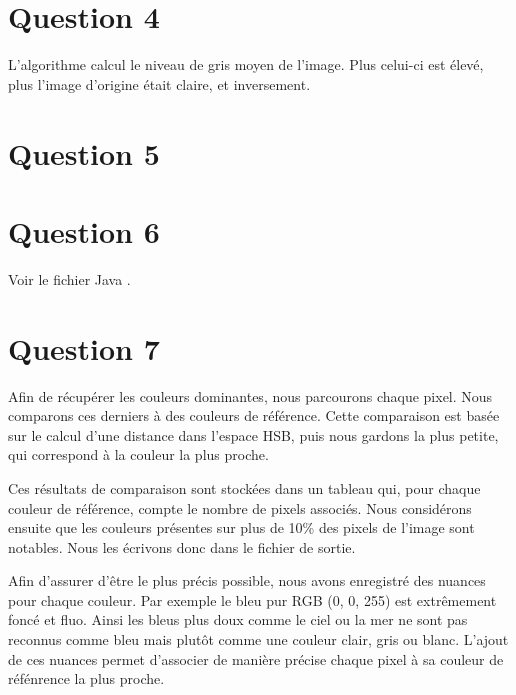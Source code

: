 \documentclass{report}
\begin{document}
		\section{Question 4}
			
			
			L'algorithme calcul le niveau de gris moyen de l'image. Plus celui-ci est élevé, plus l'image d'origine était claire, et inversement.
			
		\section{Question 5}
			
			
		\section{Question 6}
			Voir le fichier Java .
		
		\section{Question 7}
			
			
			Afin de récupérer les couleurs dominantes, nous parcourons chaque pixel. Nous comparons ces derniers à des couleurs de référence. Cette comparaison est basée sur le calcul d'une distance dans l'espace HSB, puis nous gardons la plus petite, qui correspond à la couleur la plus proche.
			
			Ces résultats de comparaison sont stockées dans un tableau qui, pour chaque couleur de référence, compte le nombre de pixels associés. Nous considérons ensuite que les couleurs présentes sur plus de 10\% des pixels de l'image sont notables. Nous les écrivons donc dans le fichier de sortie.
			
			Afin d'assurer d'être le plus précis possible, nous avons enregistré des nuances pour chaque couleur. Par exemple le bleu pur RGB (0, 0, 255) est extrêmement foncé et fluo. Ainsi les bleus plus doux comme le ciel ou la mer ne sont pas reconnus comme bleu mais plutôt comme une couleur clair, gris ou blanc. L'ajout de ces nuances permet d'associer de manière précise chaque pixel à sa couleur de réfénrence la plus proche.
			
			
			
\end{document}
